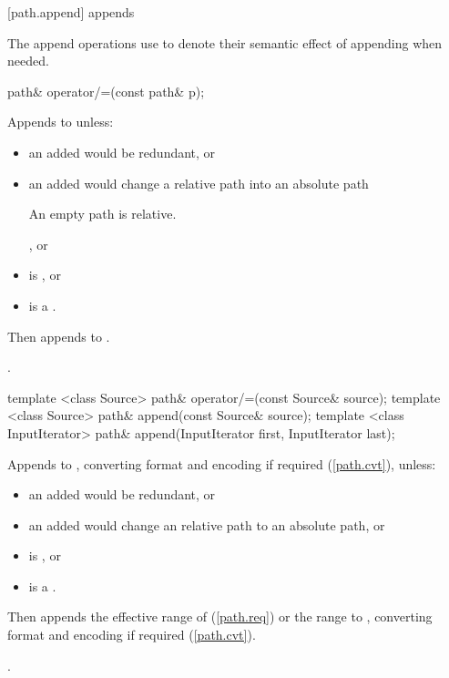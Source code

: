 [path.append]{ appends}

\pnum
The append operations use  to denote their semantic effect of appending
 when needed.

\begin{itemdecl}
path& operator/=(const path& p);
\end{itemdecl}

\begin{itemdescr}
\pnum
\effects Appends  to  unless:
\begin{itemize}
\item an added 
    would be redundant, or
\item an added  would change a relative path into an absolute path
    \begin{note} An empty path is relative.\end{note}, or
\item {} is , or
\item {} is a .
\end{itemize}
Then appends  to .

\pnum
\returns {}.
\end{itemdescr}

\begin{itemdecl}
template <class Source>
  path& operator/=(const Source& source);
template <class Source>
  path& append(const Source& source);
template <class InputIterator>
  path& append(InputIterator first, InputIterator last);
\end{itemdecl}

\begin{itemdescr}
\pnum
\effects Appends  to ,
    converting format and encoding if required (\ref{path.cvt}), unless:
\begin{itemize}
\item an added  would be redundant, or
\item an added  would change an relative path to an absolute path, or
\item {} is , or
\item {} is a .
\end{itemize}
Then appends the effective range of  (\ref{path.req})
    or the range  to ,
    converting format and encoding if required (\ref{path.cvt}).

\pnum
\returns {}.
\end{itemdescr}

